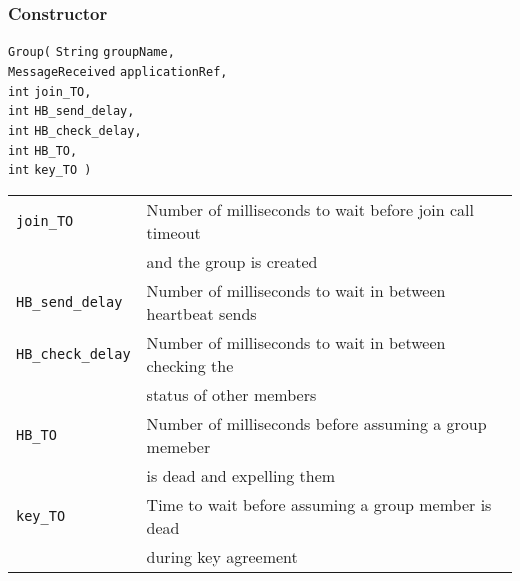 \documentclass[12pt]{article}
\newcommand{\code}[1]{\texttt{#1}}
\begin{document}
       \subsubsection{Constructor}
       \begin{tabbing}
       \code{Group(} \=\code{String} \hspace{.8in} \=\code{groupName, }      \\
		     \>\code{MessageReceived}      \>\code{applicationRef,}  \\ 
		     \>\code{int}                  \>\code{join\_TO,}        \\
		     \>\code{int}	           \>\code{HB\_send\_delay,} \\
		     \>\code{int}	           \>\code{HB\_check\_delay,}\\
		     \>\code{int}	           \>\code{HB\_TO,}          \\
		     \>\code{int}                  \>\code{key\_TO )}        \\
       \end{tabbing}
       \begin{tabular} {ll}
	   \code{join\_TO}
	     & Number of milliseconds to wait before join call timeout \\
	     & \hspace{.3in} and the group is created \\
	   \code{HB\_send\_delay}
	     & Number of milliseconds to wait in between heartbeat sends \\
	   \code{HB\_check\_delay}
	     & Number of milliseconds to wait in between checking the \\
	     & \hspace{.3in} status of other members \\
	   \code{HB\_TO}
	     & Number of milliseconds before assuming a group memeber \\
	     & \hspace{.3in} is dead and expelling them \\
	   \code{key\_TO}
	     & Time to wait before assuming a group member is dead \\
	     & \hspace{.3in} during key agreement \\
       \end{tabular}\\
\end{document}
